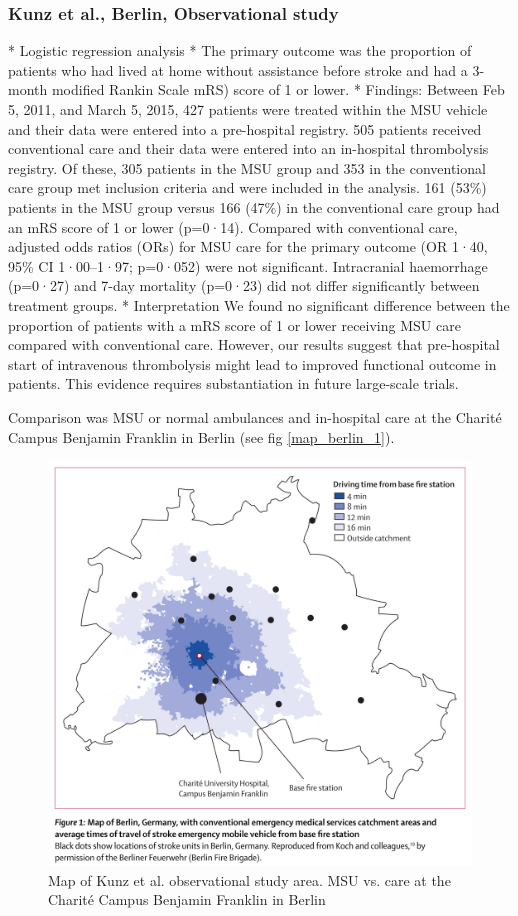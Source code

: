 \subsubsection{Kunz et al., Berlin, Observational study \cite{kunz_functional_2016}}

* Logistic regression analysis
* The primary outcome was the proportion of patients who had lived at home without assistance before stroke and had a 3-month modiﬁed Rankin Scale mRS) score of 1 or lower.
* Findings:  Between Feb 5, 2011, and March 5, 2015, 427 patients were treated within the MSU vehicle and their data were entered into a pre-hospital registry. 505 patients received conventional care and their data were entered into an in-hospital thrombolysis registry. Of these, 305 patients in the MSU group and 353 in the conventional care group met inclusion criteria and were included in the analysis. 161 (53\%) patients in the MSU group versus 166 (47\%) in the conventional care group had an mRS score of 1 or lower (p=0·14). Compared with conventional care, adjusted odds ratios (ORs) for MSU care for the primary outcome (OR 1·40, 95\% CI 1·00–1·97; p=0·052) were not signiﬁcant. Intracranial haemorrhage (p=0·27) and 7-day mortality (p=0·23) did not diﬀer signiﬁcantly between treatment groups.
* Interpretation We found no signiﬁcant diﬀerence between the proportion of patients with a mRS score of 1 or lower receiving MSU care compared with conventional care. However, our results suggest that pre-hospital start of intravenous thrombolysis might lead to improved functional outcome in patients. This evidence requires substantiation in future large-scale trials.

Comparison was MSU or normal ambulances and in-hospital care at the Charité Campus Benjamin Franklin in Berlin (see fig \ref{map_berlin_1}).

\begin{figure}
    \centering
    \includegraphics[width=0.5\linewidth]{images_background/berlin_map_1_.png}
    \caption{Map of Kunz et al. observational study area. MSU vs. care at the Charité Campus Benjamin Franklin in Berlin }
    \label{fig:map_berlin_1}
\end{figure}


